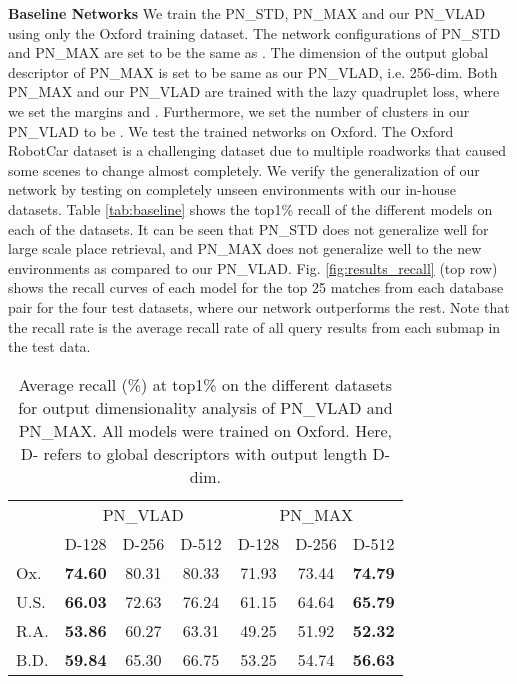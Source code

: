 \documentclass[10pt,twocolumn,letterpaper]{article}
\begin{document}
\vspace{-0.7cm}
\noindent\textbf{Baseline Networks} 
We train the PN\_STD, PN\_MAX and our PN\_VLAD using only the Oxford training dataset. The network configurations of PN\_STD and PN\_MAX are set to be the same as \cite{qi2016pointnet}. 
The dimension of the output global descriptor of PN\_MAX is set to be same as our PN\_VLAD, i.e. 256-dim.
Both PN\_MAX and our PN\_VLAD are trained with the lazy quadruplet loss, where we set the margins  and . Furthermore, we set the number of clusters in our PN\_VLAD to be . 
We test the trained networks on Oxford. The Oxford RobotCar dataset is a challenging dataset due to multiple roadworks that caused some scenes to change almost completely. We verify the generalization of our network by testing on completely unseen environments with our in-house datasets. Table \ref{tab:baseline} shows the top1\% recall of the different models on each of the datasets. 
It can be seen that PN\_STD does not generalize well for large scale place retrieval, and PN\_MAX does not generalize well to the new environments as compared to our PN\_VLAD. Fig. \ref{fig:results_recall} (top row) shows the recall curves of each model for the top 25 matches from each database pair for the four test datasets, where our network outperforms the rest. Note that the recall rate is the average recall rate of all query results from each submap in the test data. 
\newline
\begin{table}
	\begin{center}
		\begin{tabular}{|l|c|c|c|c|c|c|}
			\hline
			&\multicolumn{3}{c|}{PN\_VLAD}&\multicolumn{3}{c|}{PN\_MAX}\\
			\cline{2-7}
			&\small{D-128}&\small{D-256}&\small{D-512}&\small{D-128}&\small{D-256}&\small{D-512}\\
			\hline
			\small{Ox.}&\textbf{74.60}&80.31&80.33&71.93&73.44&\textbf{74.79}\\
			\hline
			\small{U.S.}&\textbf{66.03}&72.63&76.24&61.15&64.64&\textbf{65.79}\\
			\hline
			\small{R.A.}&\textbf{53.86}&60.27&63.31&49.25&51.92&\textbf{52.32}\\
			\hline
			\small{B.D.}&\textbf{59.84}&65.30&66.75&53.25&54.74&\textbf{56.63}\\
			\hline									
		\end{tabular}
	\end{center}
	\vspace{-0.1cm}
	\caption{Average recall (\%) at top1\% on the different datasets for output dimensionality analysis of PN\_VLAD and PN\_MAX. All models were trained on Oxford. Here, D- refers to global descriptors with output length D-dim.\vspace{-0.2cm}}
	\label{tab:dimension}
\end{table}
\end{document}
